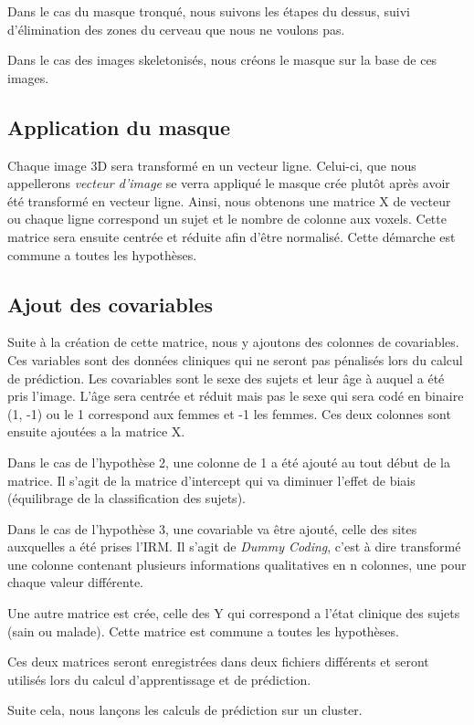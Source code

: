 Dans le cas du masque tronqué, nous suivons les étapes du dessus, suivi d'élimination des zones du cerveau que nous ne voulons pas.

Dans le cas des images skeletonisés, nous créons le masque sur la base de ces images. 


\subsection{Application du masque}

Chaque image 3D sera transformé en un vecteur ligne. Celui-ci, que nous appellerons \textit{vecteur d'image} se verra appliqué le masque crée plutôt après avoir été transformé en vecteur ligne. Ainsi, nous obtenons une matrice X de vecteur ou chaque ligne correspond un sujet et le nombre de colonne aux voxels.
Cette matrice sera ensuite centrée et réduite afin d'être normalisé. 
Cette démarche est commune a toutes les hypothèses. 

\subsection{Ajout des covariables}

Suite à la création de cette matrice, nous y ajoutons des colonnes de covariables. Ces variables sont des données cliniques qui ne seront pas pénalisés lors du calcul de prédiction. Les covariables sont le sexe des sujets et leur âge à auquel a été pris l'image. 
L'âge sera centrée et réduit mais pas le sexe qui sera codé en binaire (1, -1) ou le 1 correspond aux femmes et -1 les femmes. 
Ces deux colonnes sont ensuite ajoutées a la matrice X. 

Dans le cas de l'hypothèse 2, une colonne de 1 a été ajouté au tout début de la matrice.
Il s'agit de la matrice d'intercept qui va diminuer l'effet de biais (équilibrage de la classification des sujets).

Dans le cas de l'hypothèse 3, une covariable va être ajouté, celle des sites auxquelles a été prises l'IRM. Il s'agit de \textit{Dummy Coding}, c'est à dire transformé une colonne contenant plusieurs informations qualitatives en n colonnes, une pour chaque valeur différente. 

Une autre matrice est crée, celle des Y qui correspond a l'état clinique des sujets (sain ou malade). Cette matrice est commune a toutes les hypothèses. 

Ces deux matrices seront enregistrées dans deux fichiers différents et seront utilisés lors du calcul d'apprentissage et de prédiction.


Suite cela, nous lançons les calculs de prédiction sur un cluster. 


